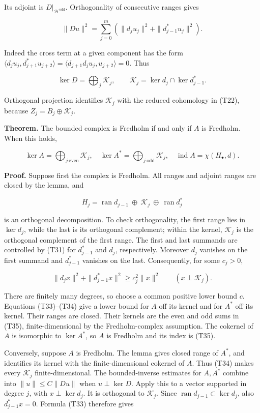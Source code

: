 \documentclass[
  11pt,
]{article}
\begin{document}
Its adjoint is \(D|_{\mathscr H^{\mathrm{odd}}}\). Orthogonality of
consecutive ranges gives

\[
\|Du\|^2=\sum_{j=0}^m
\left(\|d_ju_j\|^2+\|d_{j-1}^*u_j\|^2\right).               \tag{T33}
\]

Indeed the cross term at a given component has the form
\(\langle d_ju_j,d_{j+1}^*u_{j+2}\rangle=\langle d_{j+1}d_ju_j,u_{j+2}\rangle=0\).
Thus

\[
\ker D=\bigoplus_j\mathcal K_j,\qquad
\mathcal K_j=\ker d_j\cap\ker d_{j-1}^*.                     \tag{T34}
\]

Orthogonal projection identifies \(\mathcal K_j\) with the reduced
cohomology in (T22), because \(Z_j=B_j\oplus\mathcal K_j\).

\textbf{Theorem.} The bounded complex is Fredholm if and only if \(A\)
is Fredholm. When this holds,

\[
\ker A=\bigoplus_{j\ \mathrm{even}}\mathcal K_j,\quad
\ker A^*=\bigoplus_{j\ \mathrm{odd}}\mathcal K_j,\quad
\operatorname{ind}A=\chi(H_\bullet,d).                      \tag{T35}
\]

\textbf{Proof.} Suppose first the complex is Fredholm. All ranges and
adjoint ranges are closed by the lemma, and

\[
H_j=\operatorname{ran}d_{j-1}\ \oplus\ \mathcal K_j\
\oplus\ \operatorname{ran}d_j^*                             \tag{T36}
\]

is an orthogonal decomposition. To check orthogonality, the first range
lies in \(\ker d_j\), while the last is its orthogonal complement;
within the kernel, \(\mathcal K_j\) is the orthogonal complement of the
first range. The first and last summands are controlled by (T31) for
\(d_{j-1}^*\) and \(d_j\), respectively. Moreover \(d_j\) vanishes on
the first summand and \(d_{j-1}^*\) vanishes on the last. Consequently,
for some \(c_j>0\),

\[
\|d_jx\|^2+\|d_{j-1}^*x\|^2\geq c_j^2\|x\|^2
\qquad(x\perp\mathcal K_j).                                 \tag{T37}
\]

There are finitely many degrees, so choose a common positive lower bound
\(c\). Equations (T33)--(T34) give a lower bound for \(A\) off its
kernel and for \(A^*\) off its kernel. Their ranges are closed. Their
kernels are the even and odd sums in (T35), finite-dimensional by the
Fredholm-complex assumption. The cokernel of \(A\) is isomorphic to
\(\ker A^*\), so \(A\) is Fredholm and its index is (T35).

Conversely, suppose \(A\) is Fredholm. The lemma gives closed range of
\(A^*\), and identifies its kernel with the finite-dimensional cokernel
of \(A\). Thus (T34) makes every \(\mathcal K_j\) finite-dimensional.
The bounded-inverse estimates for \(A,A^*\) combine into
\(\|u\|\leq C\|Du\|\) when \(u\perp\ker D\). Apply this to a vector
supported in degree \(j\), with \(x\perp\ker d_j\). It is orthogonal to
\(\mathcal K_j\). Since \(\operatorname{ran}d_{j-1}\subset\ker d_j\),
also \(d_{j-1}^*x=0\). Formula (T33) therefore gives
\end{document}
